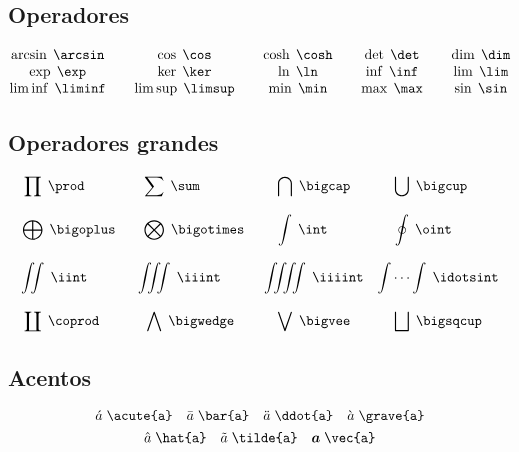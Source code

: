 \subsection{Operadores}
\begin{equation*}
    \begin{matrix}
    \arcsin \; \verb|\arcsin  | & \cos \; \verb|\cos  | & \cosh \; \verb|\cosh  | & \det \; \verb|\det  | & \dim \; \verb|\dim| \\ 
    \exp \; \verb|\exp  | & \ker \; \verb|\ker  | & \ln \; \verb|\ln  | & \inf \; \verb|\inf  | & \lim \; \verb|\lim| \\ 
    \liminf \; \verb|\liminf  | & \limsup \; \verb|\limsup  | & \min \; \verb|\min  | & \max \; \verb|\max  | & \sin \; \verb|\sin|
    \end{matrix} 
\end{equation*}

\subsection{Operadores grandes}
\begin{equation*}
    \begin{matrix}
    \displaystyle \prod \; \verb|\prod     | & \displaystyle \sum \; \verb|\sum      | & \displaystyle \bigcap \; \verb|\bigcap| & \displaystyle \bigcup \; \verb|\bigcup  | \\ 
    \\
    \displaystyle \bigoplus \; \verb|\bigoplus | & \displaystyle \bigotimes \; \verb|\bigotimes| & \displaystyle \int \; \verb|\int   | & \displaystyle \oint \; \verb|\oint    | \\ 
    \\
    \displaystyle \iint \; \verb|\iint     | & \displaystyle \iiint \; \verb|\iiint    | & \displaystyle \iiiint \; \verb|\iiiint| & \displaystyle \idotsint \; \verb|\idotsint| \\
    \\
    \displaystyle \coprod \; \verb|\coprod   | & \displaystyle \bigwedge \; \verb|\bigwedge | & \displaystyle \bigvee \; \verb|\bigvee| & \displaystyle \bigsqcup \; \verb|\bigsqcup|
    \end{matrix} 
\end{equation*}
\newpage
\subsection{Acentos}
\begin{equation*}
    \acute{a} \; \verb|\acute{a}| \quad \bar{a} \; \verb|\bar{a}| \quad \ddot{a} \; \verb|\ddot{a}| \quad \grave{a} \; \verb|\grave{a}|
\end{equation*}
\begin{equation*}
    \hat{a} \; \verb|\hat{a}| \quad \tilde{a} \; \verb|\tilde{a}| \quad \vec{a} \; \verb|\vec{a}|
\end{equation*}

